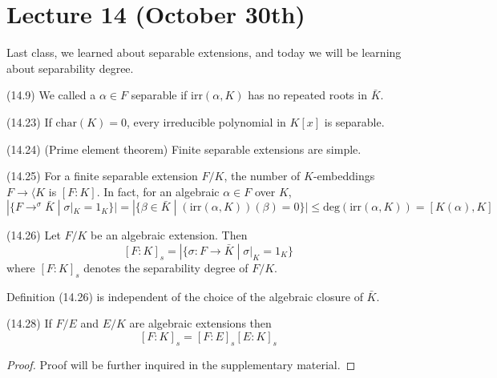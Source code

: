 \section{Lecture 14 (October 30th)}
\begin{rmk}
Last class, we learned about separable extensions, and today we will be learning about separability degree.
\end{rmk}
\vspace{2ex}
\begin{defi}
(14.9) We called a $\alpha \in F$ separable if $\mathrm{irr}(\alpha ,K)$ has no repeated roots in $\bar{K}$. 
\end{defi}
\vspace{2ex}
\begin{prop}
(14.23) If $\mathrm{char}(K)=0$, every irreducible polynomial in $K[x]$ is separable. 
\end{prop}
\vspace{2ex}
\begin{prop}
(14.24) (Prime element theorem) Finite separable extensions are simple. 
\end{prop}
\vspace{2ex}
\begin{cor}
(14.25) For a finite separable extension $F/K$, the number of $K$-embeddings $F\rightarrow \langle K$ is $[F:K]$. In fact, for an algebraic $\alpha \in  F$ over $K$,
\[|\{F\mathop{\rightarrow }^{\sigma }\bar{K} \;|\; \sigma |_{K}=\mathrm{1}_{K} \}|=|\{\beta \in \bar{K} \;|\; (\mathrm{irr}(\alpha ,K))(\beta )=0 \}|\leq \mathrm{deg}(\mathrm{irr}(\alpha ,K))=[K(\alpha ),K]\]
\end{cor}
\vspace{2ex}
\begin{defi}
(14.26) Let $F/K$ be an algebraic extension. Then
\[[F:K]_{s}=|\{\sigma :F\rightarrow \bar{K} \;|\; \sigma |_{K}=\mathrm{1}_{K} \}\]
where $[F:K]_{s}$ denotes the separability degree of $F/K$.
\end{defi}
\vspace{2ex}
\begin{rmk}
Definition (14.26) is independent of the choice of the algebraic closure of $\bar{K}$.
\end{rmk}
\vspace{2ex}
\begin{prop}
(14.28) If $F/E$ and $E/K$ are algebraic extensions then
\[[F:K]_{s}=[F:E]_{s}[E:K]_{s}\]
\end{prop}
\vspace{2ex}
\begin{proof}
Proof will be further inquired in the supplementary material.
\end{proof}
